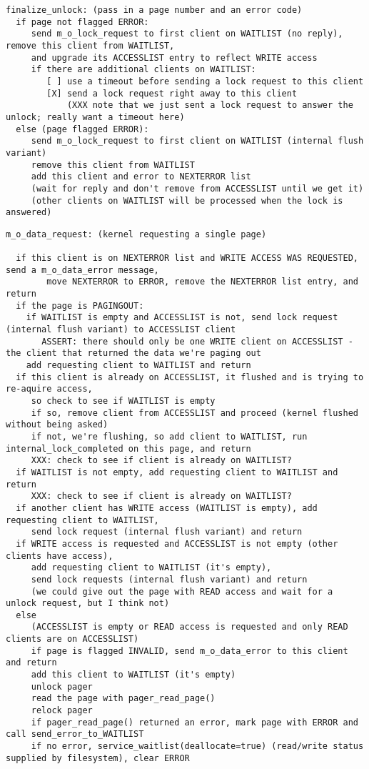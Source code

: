 \documentclass{article}
\begin{document}
\begin{verbatim}
finalize_unlock: (pass in a page number and an error code)
  if page not flagged ERROR:
     send m_o_lock_request to first client on WAITLIST (no reply), remove this client from WAITLIST,
     and upgrade its ACCESSLIST entry to reflect WRITE access
     if there are additional clients on WAITLIST:
        [ ] use a timeout before sending a lock request to this client
        [X] send a lock request right away to this client
            (XXX note that we just sent a lock request to answer the unlock; really want a timeout here)
  else (page flagged ERROR):
     send m_o_lock_request to first client on WAITLIST (internal flush variant)
     remove this client from WAITLIST
     add this client and error to NEXTERROR list
     (wait for reply and don't remove from ACCESSLIST until we get it)
     (other clients on WAITLIST will be processed when the lock is answered)
\end{verbatim}

\begin{verbatim}
m_o_data_request: (kernel requesting a single page)

  if this client is on NEXTERROR list and WRITE ACCESS WAS REQUESTED, send a m_o_data_error message,
        move NEXTERROR to ERROR, remove the NEXTERROR list entry, and return
  if the page is PAGINGOUT:
    if WAITLIST is empty and ACCESSLIST is not, send lock request (internal flush variant) to ACCESSLIST client
       ASSERT: there should only be one WRITE client on ACCESSLIST - the client that returned the data we're paging out
    add requesting client to WAITLIST and return
  if this client is already on ACCESSLIST, it flushed and is trying to re-aquire access,
     so check to see if WAITLIST is empty
     if so, remove client from ACCESSLIST and proceed (kernel flushed without being asked)
     if not, we're flushing, so add client to WAITLIST, run internal_lock_completed on this page, and return
     XXX: check to see if client is already on WAITLIST?
  if WAITLIST is not empty, add requesting client to WAITLIST and return
     XXX: check to see if client is already on WAITLIST?
  if another client has WRITE access (WAITLIST is empty), add requesting client to WAITLIST,
     send lock request (internal flush variant) and return
  if WRITE access is requested and ACCESSLIST is not empty (other clients have access),
     add requesting client to WAITLIST (it's empty),
     send lock requests (internal flush variant) and return
     (we could give out the page with READ access and wait for a unlock request, but I think not)
  else
     (ACCESSLIST is empty or READ access is requested and only READ clients are on ACCESSLIST)
     if page is flagged INVALID, send m_o_data_error to this client and return
     add this client to WAITLIST (it's empty)
     unlock pager
     read the page with pager_read_page()
     relock pager
     if pager_read_page() returned an error, mark page with ERROR and call send_error_to_WAITLIST
     if no error, service_waitlist(deallocate=true) (read/write status supplied by filesystem), clear ERROR
\end{verbatim}
\end{document}
